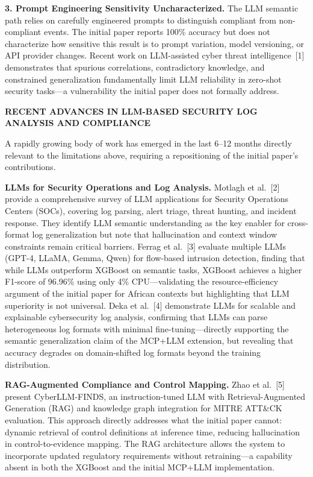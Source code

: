 \documentclass[12pt]{article}
\begin{document}
\textbf{3. Prompt Engineering Sensitivity Uncharacterized.} The LLM semantic path relies on carefully engineered prompts to distinguish compliant from non-compliant events. The initial paper reports 100\% accuracy but does not characterize how sensitive this result is to prompt variation, model versioning, or API provider changes. Recent work on LLM-assisted cyber threat intelligence~[1] demonstrates that spurious correlations, contradictory knowledge, and constrained generalization fundamentally limit LLM reliability in zero-shot security tasks---a vulnerability the initial paper does not formally address.

\bigskip

\textbf{RECENT ADVANCES IN LLM-BASED SECURITY LOG ANALYSIS AND COMPLIANCE}

A rapidly growing body of work has emerged in the last 6--12 months directly relevant to the limitations above, requiring a repositioning of the initial paper's contributions.

\textbf{LLMs for Security Operations and Log Analysis.} Motlagh et al.~[2] provide a comprehensive survey of LLM applications for Security Operations Centers (SOCs), covering log parsing, alert triage, threat hunting, and incident response. They identify LLM semantic understanding as the key enabler for cross-format log generalization but note that hallucination and context window constraints remain critical barriers. Ferrag et al.~[3] evaluate multiple LLMs (GPT-4, LLaMA, Gemma, Qwen) for flow-based intrusion detection, finding that while LLMs outperform XGBoost on semantic tasks, XGBoost achieves a higher F1-score of 96.96\% using only 4\% CPU---validating the resource-efficiency argument of the initial paper for African contexts but highlighting that LLM superiority is not universal. Deka et al.~[4] demonstrate LLMs for scalable and explainable cybersecurity log analysis, confirming that LLMs can parse heterogeneous log formats with minimal fine-tuning---directly supporting the semantic generalization claim of the MCP+LLM extension, but revealing that accuracy degrades on domain-shifted log formats beyond the training distribution.

\textbf{RAG-Augmented Compliance and Control Mapping.} Zhao et al.~[5] present CyberLLM-FINDS, an instruction-tuned LLM with Retrieval-Augmented Generation (RAG) and knowledge graph integration for MITRE ATT\&CK evaluation. This approach directly addresses what the initial paper cannot: dynamic retrieval of control definitions at inference time, reducing hallucination in control-to-evidence mapping. The RAG architecture allows the system to incorporate updated regulatory requirements without retraining---a capability absent in both the XGBoost and the initial MCP+LLM implementation.
\end{document}
